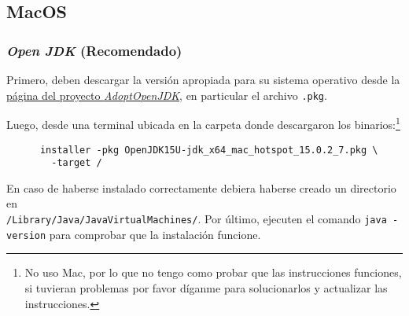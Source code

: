 \subsection{MacOS}
  \subsubsection{\textit{Open JDK} (Recomendado)}
    Primero, deben descargar la versión apropiada para su sistema operativo desde la 
    \href{https://adoptopenjdk.net/releases.html?variant=openjdk15&jvmVariant=hotspot}{página del 
    proyecto \textit{AdoptOpenJDK}}, en particular el archivo \texttt{.pkg}.

    Luego, desde una terminal ubicada en la carpeta donde descargaron los binarios:\footnote{No uso 
    Mac, por lo que no tengo como probar que las instrucciones funciones, si tuvieran problemas por 
    favor díganme para solucionarlos y actualizar las instrucciones.}

    \begin{verbatim}
      installer -pkg OpenJDK15U-jdk_x64_mac_hotspot_15.0.2_7.pkg \
        -target /
    \end{verbatim}

    En caso de haberse instalado correctamente debiera haberse creado un directorio en \\
    \texttt{/Library/Java/JavaVirtualMachines/}.
    Por último, ejecuten el comando \texttt{java -version} para comprobar que la instalación 
    funcione.